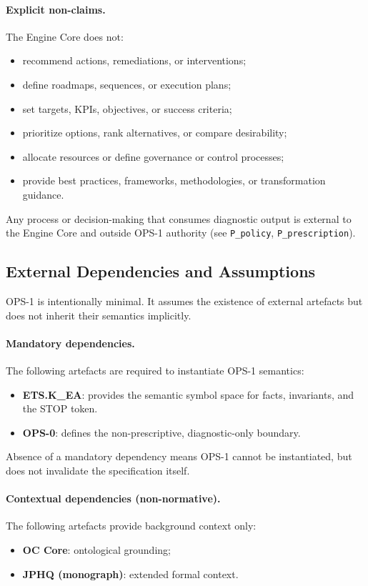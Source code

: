 \paragraph{Explicit non-claims.}
The Engine Core does not:
\begin{itemize}
  \item recommend actions, remediations, or interventions;
  \item define roadmaps, sequences, or execution plans;
  \item set targets, KPIs, objectives, or success criteria;
  \item prioritize options, rank alternatives, or compare desirability;
  \item allocate resources or define governance or control processes;
  \item provide best practices, frameworks, methodologies, or transformation guidance.
\end{itemize}

Any process or decision-making that consumes diagnostic output is external to the
Engine Core and outside OPS-1 authority
(see \texttt{P\_policy}, \texttt{P\_prescription}).

\subsection{External Dependencies and Assumptions}

OPS-1 is intentionally minimal.
It assumes the existence of external artefacts but does not inherit their
semantics implicitly.

\paragraph{Mandatory dependencies.}
The following artefacts are required to instantiate OPS-1 semantics:
\begin{itemize}
  \item \textbf{ETS.K\_EA}: provides the semantic symbol space for facts,
        invariants, and the STOP token.
  \item \textbf{OPS-0}: defines the non-prescriptive, diagnostic-only boundary.
\end{itemize}

Absence of a mandatory dependency means OPS-1 cannot be instantiated,
but does not invalidate the specification itself.

\paragraph{Contextual dependencies (non-normative).}
The following artefacts provide background context only:
\begin{itemize}
  \item \textbf{OC Core}: ontological grounding;
  \item \textbf{JPHQ (monograph)}: extended formal context.
\end{itemize}

